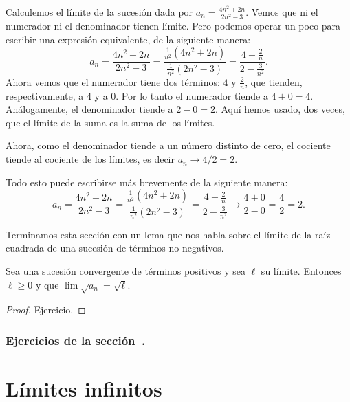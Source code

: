 \begin{example}
    Calculemos el límite de la sucesión dada por $a_n=\frac{4n^2+2n}{2n^2-3}$. Vemos que ni el numerador ni el denominador tienen límite.
    Pero podemos operar un poco para escribir una expresión equivalente, de la siguiente manera:
    \[
    a_n = \frac{4n^2+2n}{2n^2-3}
    = \frac{\frac1{n^2}(4n^2+2n)}{\frac1{n^2}(2n^2-3)}
    = \frac{4 + \frac2n}{2 - \frac{3}{n^2}}.
    \]
    Ahora vemos que el numerador tiene dos términos: $4$ y $\frac2n$, que tienden, respectivamente, a 4 y a 0. Por lo tanto el numerador tiende a $4+0=4$.
    Análogamente, el denominador tiende a $2-0=2$. Aquí hemos usado, dos veces, que el límite de la suma es la suma de los límites.

    Ahora, como el denominador tiende a un número distinto de cero, el cociente tiende al cociente de los límites, es decir $a_n \to 4/2 = 2$. 

    Todo esto puede escribirse más brevemente de la siguiente manera:
    \[
    a_n = \frac{4n^2+2n}{2n^2-3}
    = \frac{\frac1{n^2}(4n^2+2n)}{\frac1{n^2}(2n^2-3)}
    = \frac{4 + \frac2n}{2 - \frac{3}{n^2}}
    \to \frac{4 + 0}{2 - 0} = \frac42 = 2.
    \]
    \end{example}

Terminamos esta sección con un lema que nos habla sobre el límite de la raíz cuadrada de una sucesión de términos no negativos.

\begin{lemma}\label{L:limite de la raiz}
        Sea \sucan una sucesión convergente de términos positivos y sea $\ell$ su límite. Entonces $\ell\ge 0$ y que $\lim \sqrt{a_n}=\sqrt{\ell}$.
\end{lemma}

\begin{proof}
    Ejercicio.
\end{proof}

\subsubsection*{Ejercicios de la sección~.}

\begin{enumerate}

\end{enumerate}



\section{Límites infinitos}

